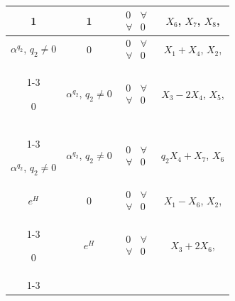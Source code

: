 \begin{center}
\begin{tabular}{|c|c|c|c|}
1 & 1 & $\begin{matrix} 0 & \forall \\ \forall & 0\end{matrix}$


& $X_6$, $X_7$, $X_8$, \\ 


\hline


%


$\alpha^{q_2}$, $q_2\ne0$ & 0 &


$\begin{matrix} 0 & \forall \\ \forall & 0\end{matrix}$


& $X_1+X_4$, $X_2$, \\


\cline{1-3}


0 & $\alpha^{q_2}$, $q_2\ne0$ &


$\begin{matrix} 0 & \forall \\ \forall & 0\end{matrix}$ &


$X_3-2X_4$, $X_5$, \\


\cline{1-3}


$\alpha^{q_2}$, $q_2\ne0$ & $\alpha^{q_2}$, $q_2\ne0$ &


$\begin{matrix} 0 & \forall \\ \forall & 0\end{matrix}$ &


$q_2X_4+X_7$, $X_6$\\


\hline


%


$e^H$ & 0 & $\begin{matrix} 0 & \forall \\ \forall & 0\end{matrix}$


& $X_1-X_6$, $X_2$, \\


\cline{1-3}


0 & $e^H$ & $\begin{matrix} 0 & \forall \\ \forall & 0\end{matrix}$


& $X_3+2X_6$, \\


\cline{1-3}



\end{tabular}
\end{center}
